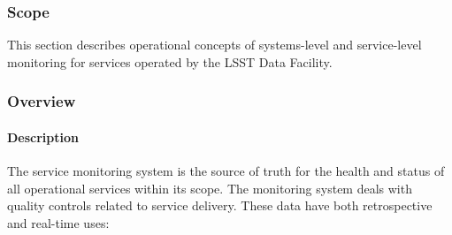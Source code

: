 ﻿\subsubsection{Scope}
This section describes operational concepts of systems-level and service-level 
monitoring for services operated by the LSST Data Facility. 

\subsubsection{Overview}

\paragraph{Description}

The service monitoring system is the source of truth for the health and status 
of all operational services within its scope. The monitoring system deals with 
quality controls related to service delivery. These data have both retrospective 
and real-time uses:

